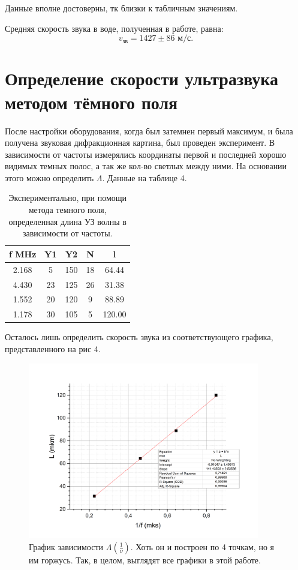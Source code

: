 \documentclass[a4paper, 14pt]{extarticle}%
\newcommand\ECaption[1]{%
     \captionsetup{font=footnotesize}%
     \caption{#1}}
\begin{document}
Данные вполне достоверны, тк близки к табличным значениям.

Средняя скорость звука в воде, полученная в работе, равна:
\[v_{\text{зв}} = 1427\pm86 \text{ м/с}.\]

\section*{Определение скорости ультразвука методом тёмного поля}

После настройки оборудования, когда был затемнен первый максимум, и была получена звуковая дифракционная картина, был проведен эксперимент. В зависимости от частоты измерялись координаты первой и последней хорошо видимых темных полос, а так же кол-во светлых между ними. На основании этого можно определить $\Lambda$. Данные на таблице 4.

\begin{table}[h!]
\begin{center}

\begin{tabular}{|c|c|c|c|c|}
\hline
\rowcolor[HTML]{9698ED} 
f MHz & Y1 & Y2  & N  & l      \\ \hline
2.168 & 5  & 150 & 18 & 64.44  \\ \hline
\rowcolor[HTML]{9698ED} 
4.430 & 23 & 125 & 26 & 31.38  \\ \hline
1.552 & 20 & 120 & 9  & 88.89  \\ \hline
\rowcolor[HTML]{9698ED} 
1.178 & 30 & 105 & 5  & 120.00 \\ \hline
\end{tabular}
\ECaption{Экспериментально, при помощи метода темного поля, определенная длина УЗ волны в зависимости от частоты.}
\end{center}
\end{table}

Осталось лишь определить скорость звука из соответствующего графика, представленного на рис 4.

\begin{figure}[h]
\begin{center}
\includegraphics[width=0.9\textwidth]{gr2}
\end{center}
\ECaption{График зависимости $\Lambda(\frac{1}{\nu})$. Хоть он и построен по 4 точкам, но я им горжусь. Так, в целом, выглядят все графики в этой работе.}
\end{figure}
\end{document}
